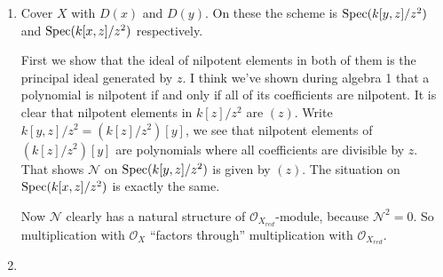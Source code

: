 \newcommand{\sheet}{7}




\maketitle{}

\begin{exercise}{1}
    \begin{enumerate}
        \item{
                Cover $X$ with $D(x)$ and $D(y)$. On these the scheme is
                $\operatorname{Spec}(k[y, z] / z^2)$ and $\operatorname{Spec}(k[x, z] / z^2)$ respectively.
                
                First we show that the ideal of nilpotent elements in both of
                them is the principal ideal generated by $z$. I think we've
                shown during algebra 1 that a polynomial is nilpotent if and
                only if all of its coefficients are nilpotent. It is clear that nilpotent
                elements in $k[z] / z^2$ are $(z)$. Write
                $k[y, z] / z^2 = (k[z] / z^2)[y]$, we see that nilpotent
                elements of $(k[z] / z^2)[y]$ are polynomials where all
                coefficients are divisible by $z$. That shows $\mathcal{N}$ on
                $\operatorname{Spec}(k[y, z] / z^2)$ is given by $(z)$.
                The situation on $\operatorname{Spec}(k[x, z] / z^2)$ is exactly the same.

                Now $\mathcal{N}$ clearly has a natural structure of
                $\mathcal{O}_{X_{red}}$-module, because $\mathcal{N}^2 = 0$.
                So multiplication with $\mathcal{O}_X$ ``factors through''
                multiplication with $\mathcal{O}_{X_{red}}$.
            }
        \item{
            }
    \end{enumerate}
\end{exercise}

